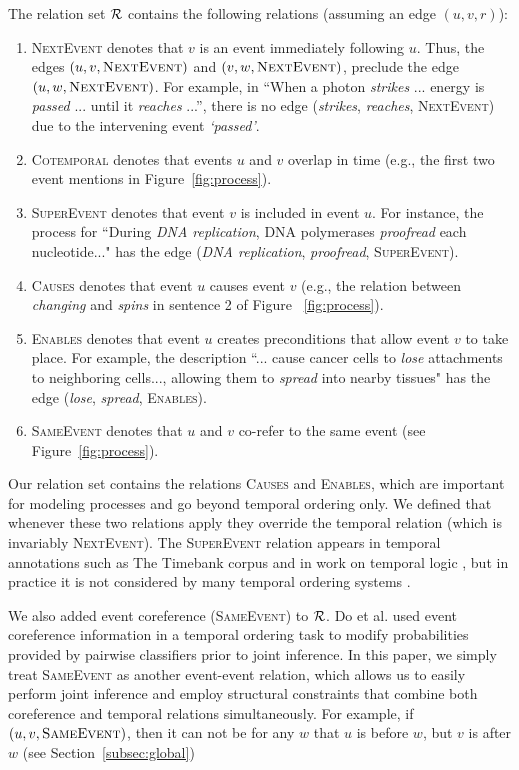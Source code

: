 The relation set $\mathcal{R}$ contains the following relations (assuming an edge $(u,v,r)$):
\begin{enumerate}[itemsep=0pt,topsep=0pt] 
\item \textsc{NextEvent} denotes that $v$ is an event immediately following $u$. Thus, the edges $(u,v,\mbox{\textsc{NextEvent}})$ and $(v,w,\mbox{\textsc{NextEvent}})$, preclude the edge $(u,w,\mbox{\textsc{NextEvent}})$. For example, in ``When a photon \emph{strikes} ... energy is  \emph{passed} ... until it \emph{reaches} ...'', there is no edge (\emph{strikes}, \emph{reaches}, \textsc{NextEvent}) due to the intervening event \emph{`passed'}.
\item \textsc{Cotemporal} denotes that events $u$ and $v$ overlap in time (e.g., the first two event mentions in Figure~\ref{fig:process}).
\item \textsc{SuperEvent} denotes that event $v$ is included in event $u$. For instance, the process for ``During \emph{DNA replication}, DNA polymerases \emph{proofread} each nucleotide..." has the edge (\emph{DNA replication}, \emph{proofread}, \textsc{SuperEvent}).
\item \textsc{Causes} denotes that event $u$ causes event $v$ (e.g., the relation between \emph{changing} and \emph{spins} in sentence 2 of Figure ~\ref{fig:process}).
\item \textsc{Enables} denotes that event $u$ creates preconditions that allow event $v$ to take place. For example, the description ``... cause cancer cells  to \emph{lose} attachments to neighboring cells..., allowing them to \emph{spread} into nearby tissues" has the edge (\emph{lose}, \emph{spread}, \textsc{Enables}).
\item \textsc{SameEvent} denotes that $u$ and $v$ co-refer to the same event (see Figure~\ref{fig:process}).
\end{enumerate}

Our relation set contains the relations \textsc{Causes} and \textsc{Enables}, which are important for modeling processes and go beyond temporal ordering only. We defined that whenever these two relations apply they override the temporal relation (which is invariably \textsc{NextEvent}). The \textsc{SuperEvent} relation appears in temporal annotations such as The Timebank corpus \cite{Pustejovsky03} and in work on temporal logic \cite{Allen83}, but in practice it is not considered by many temporal ordering systems \cite{Chambers08,Yoshikawa09,Do12}. 

We also added event coreference (\textsc{SameEvent}) to $\mathcal{R}$. Do et al.  used event coreference information in a temporal ordering task to modify probabilities provided by pairwise classifiers prior to joint inference. In this paper, we simply treat \textsc{SameEvent} as another event-event relation, which allows us to easily perform joint inference and employ structural constraints that combine both coreference and temporal relations simultaneously. For example, if $(u,v,\mbox{\textsc{SameEvent}})$, then it can not be for any $w$ that $u$ is before $w$, but $v$ is after $w$ (see Section~\ref{subsec:global})


